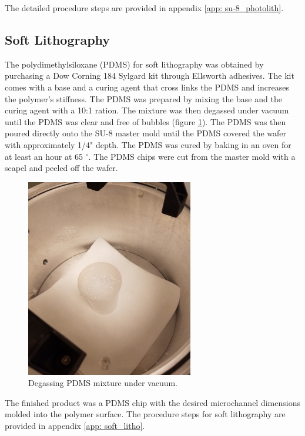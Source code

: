 The detailed procedure steps are provided in appendix \ref{app: su-8_photolith}.

\subsection*{Soft Lithography}
\par The polydimethylsiloxane (PDMS) for soft lithography was obtained by purchasing a Dow Corning 184 Sylgard kit through Ellsworth adhesives. The kit comes with a base and a curing agent that cross links the PDMS and increases the polymer's stiffness. The PDMS was prepared by mixing the base and the curing agent with a 10:1 ration. The mixture was then degassed under vacuum until the PDMS was clear and free of bubbles (figure \ref{fig:pdms_vacuum}). The PDMS was then poured directly onto the SU-8 master mold until the PDMS covered the wafer with approximately 1/4" depth. The PDMS was cured by baking in an oven for at least an hour at 65 $^\circ$. The PDMS chips were cut from the master mold with a scapel and peeled off the wafer. 

\begin{figure}[h]
    \centering
    \includegraphics[width=0.65\textwidth]{images/pdms_in_vacuum.jpg}
    \caption{Degassing PDMS mixture under vacuum.}
    \label{fig:pdms_vacuum}
\end{figure}


\par The finished product was a PDMS chip with the desired microchannel dimensions molded into the polymer surface. The procedure steps for soft lithography are provided in appendix \ref{app: soft_litho}.



